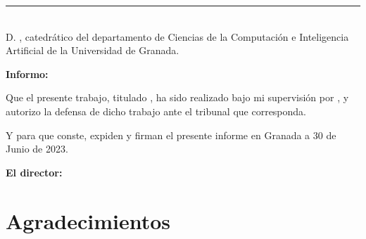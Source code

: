 \cleardoublepage

\thispagestyle{empty}

\noindent\rule[-1ex]{\textwidth}{2pt}\\[4.5ex]

D. \textbf{\tutor}, catedrático del departamento de Ciencias de la
Computación e Inteligencia Artificial de la Universidad de Granada.

\vspace{0.5cm}

\textbf{Informo:}

\vspace{0.5cm}

Que el presente trabajo, titulado \textit{\textbf{\titulo}},
ha sido realizado bajo mi supervisión por \textbf{\minombre}, y autorizo la defensa de dicho trabajo ante el tribunal
que corresponda.

\vspace{0.5cm}

Y para que conste, expiden y firman el presente informe en Granada a 30 de Junio de 2023.

\vspace{1cm}

\textbf{El director: }

\vspace{5cm}

\noindent \textbf{\tutor}

\chapter*{Agradecimientos}




